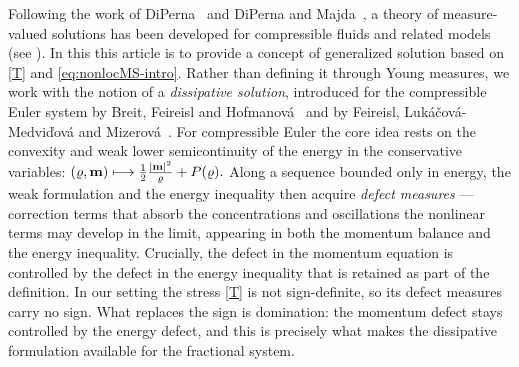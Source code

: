 \documentclass[12pt,a4paper,twoside]{article}
\newcommand{\vr}{\varrho}
\newcommand{\vc}[1]{{\bf #1}}
\numberwithin{equation}{section}%
\newcommand{\vm}{\vc{m}}
\begin{document}
Following the work of DiPerna~\cite{D1985} and DiPerna and Majda~\cite{DM1987}, a theory of
measure-valued solutions has been developed for compressible fluids and related models (see
\cite{BDS11, FjMT2012, BF2018a, Bd2020, FL2018, CGZ2023}). In this this article is to
provide a concept of generalized solution based on \eqref{T} and \eqref{eq:nonlocMS-intro}.
Rather than defining it through Young measures, we work with the notion of a \emph{dissipative
	solution}, introduced for the compressible Euler system by Breit, Feireisl and
Hofmanov\'a~\cite{BeFH2020d} and by Feireisl, Luk\'a\v{c}ov\'a-Medvi\v{d}ov\'a and
Mizerov\'a~\cite{FLM2020i}. For compressible Euler the core idea rests on the convexity and
weak lower semicontinuity of the energy in the conservative variables: $(\vr,\vm)\longmapsto \frac{1}{2}\frac{|\vm|^2}{\vr}+P(\vr). $
Along a sequence bounded only in energy, the weak formulation and the energy inequality then
acquire \emph{defect measures} --- correction terms that absorb the concentrations and oscillations the nonlinear terms may develop in the limit, appearing in both the momentum balance and the energy inequality. Crucially, the defect in the momentum equation is controlled by the defect in the energy inequality that is retained as part of the definition. In our setting the stress \eqref{T} is not sign-definite, so its defect measures carry no sign. What replaces the sign is domination: the momentum defect stays controlled by the energy defect, and this is precisely what makes the dissipative formulation available for the fractional system.
	\medskip
	
\end{document}
